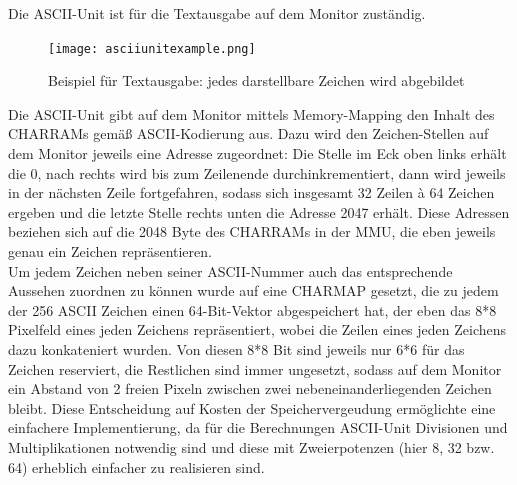 
\label{ch:asciiunit}
Die ASCII-Unit ist f\"ur die Textausgabe auf dem Monitor zust\"andig.

\begin{figure}[!htbp]
	\centering
	\texttt{[image: asciiunitexample.png]}
	\caption[Beispiel Textausgabe]{Beispiel f\"ur Textausgabe: jedes darstellbare Zeichen wird abgebildet}
	\label{fig:exampletext}
\end{figure}


Die ASCII-Unit gibt auf dem Monitor mittels Memory-Mapping den Inhalt des CHARRAMs gem{\"a}{\ss} ASCII-Kodierung aus. Dazu wird den Zeichen-Stellen auf dem Monitor jeweils eine Adresse zugeordnet: Die Stelle im Eck oben links erh\"alt die 0, nach rechts wird bis zum Zeilenende durchinkrementiert, dann wird jeweils in der n\"achsten Zeile fortgefahren, sodass sich insgesamt 32 Zeilen \`a 64 Zeichen ergeben und die letzte Stelle rechts unten die Adresse 2047 erh\"alt. Diese Adressen beziehen sich auf die 2048 Byte des CHARRAMs in der MMU, die eben jeweils genau ein Zeichen repr\"asentieren.\\
Um jedem Zeichen neben seiner ASCII-Nummer auch das entsprechende Aussehen zuordnen zu k\"onnen wurde auf eine CHARMAP gesetzt, die zu jedem der 256 ASCII Zeichen einen 64-Bit-Vektor abgespeichert hat, der eben das 8*8 Pixelfeld eines jeden Zeichens repr\"asentiert, wobei die Zeilen eines jeden Zeichens dazu konkateniert wurden. Von diesen 8*8 Bit sind jeweils nur 6*6 f\"ur das Zeichen reserviert, die Restlichen sind immer ungesetzt, sodass auf dem Monitor ein Abstand von 2 freien Pixeln zwischen zwei nebeneinanderliegenden Zeichen bleibt. Diese Entscheidung auf Kosten der Speichervergeudung erm\"oglichte eine einfachere Implementierung, da f\"ur die Berechnungen ASCII-Unit Divisionen und Multiplikationen notwendig sind und diese mit Zweierpotenzen (hier 8, 32 bzw. 64) erheblich einfacher zu realisieren sind.


